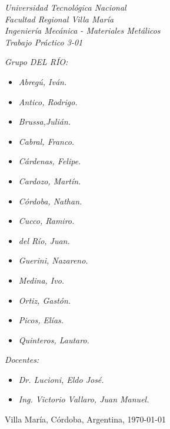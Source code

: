 \begin{titlepage}
	
	\begin{center}
		{\huge \textit{Universidad Tecnológica Nacional}}\\
        \vspace{0.5cm}
		{\LARGE \textit{Facultad Regional Villa María}}\\
		\vspace{1.5cm}
        {\LARGE{\textit{Ingeniería Mecánica - Materiales Metálicos}}}\\
		\vspace{1.5cm}
        \LARGE{\textit{Trabajo Práctico 3-01}}
	\end{center}
	
	\vfill

    \textit{Grupo DEL RÍO:}
	\begin{itemize}
		\item \textit{Abregú, Iván.}
		\item \textit{Antico, Rodrigo.}
		\item \textit{Brussa,Julián.}
		\item \textit{Cabral, Franco.}
        \item \textit{Cárdenas, Felipe.}
        \item \textit{Cardozo, Martín.}
        \item \textit{Córdoba, Nathan.}
        \item \textit{Cucco, Ramiro.}
        \item \textit{del Río, Juan.}
        \item \textit{Guerini, Nazareno.}
        \item \textit{Medina, Ivo.}
        \item \textit{Ortiz, Gastón.}
        \item \textit{Picos, Elías.}
        \item \textit{Quinteros, Lautaro.}
	\end{itemize}
    
	\textit{Docentes:}
	\begin{itemize}
		\item \textit{Dr. Lucioni, Eldo José.}
		\item \textit{Ing. Victorio Vallaro, Juan Manuel.}
	\end{itemize}
	\begin{center}
		Villa María, Córdoba, Argentina, \today
	\end{center}
\end{titlepage}
